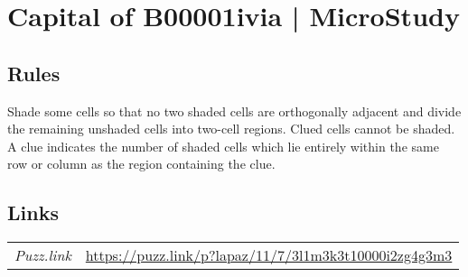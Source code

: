 \section{Capital of B00001ivia | {\normalfont MicroStudy}}
\label{sec:33-capital-of-b00001ivia-microstudy}

\subsection*{Rules}
\begin{markdown}
Shade some cells so that no two shaded cells are orthogonally adjacent and divide the remaining unshaded cells into two-cell regions. Clued cells cannot be shaded. A clue indicates the number of shaded cells which lie entirely within the same row or column as the region containing the clue.
\end{markdown}
\subsection*{Links}
\begin{tabularx}{\textwidth}{l X}
\emph{Puzz.link} & \url{https://puzz.link/p?lapaz/11/7/3l1m3k3t10000i2zg4g3m3} \\
\end{tabularx}
\pagebreak
